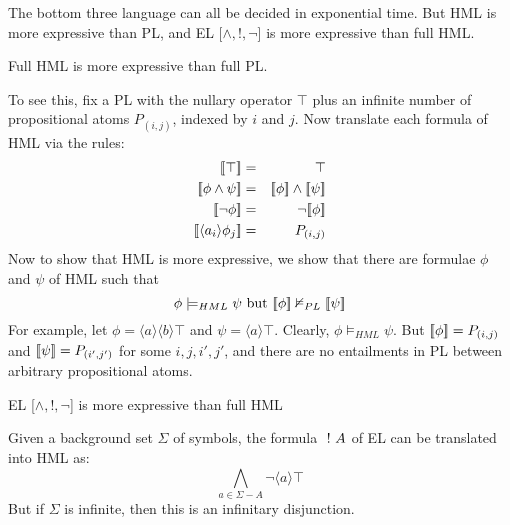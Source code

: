 The bottom three language can all be decided in exponential time.
But HML is more expressive than PL, and EL [$\land, !, \neg$]  is more expressive than full HML. 
\begin{proposition}
Full HML  is more expressive than full PL.
\end{proposition}
To see this, fix a PL with the nullary operator $\top$ plus an infinite number of propositional atoms $P_{(i,j)}$, indexed by $i$ and $j$.
Now translate each formula of HML via the rules:
\begin{eqnarray*}
\SEMB{\top}  & = & \top  \\
\SEMB{\phi \land \psi} & = & \SEMB{\phi} \land \SEMB{\psi}  \\
\SEMB{\neg \phi} & = & \neg \SEMB{\phi}   \\
\SEMB{\langle a_i \rangle \phi_j} & = & P_{(i,j)} 
\end{eqnarray*}
Now to show that HML is more expressive, we show that there are formulae $\phi$ and $\psi$ of HML such that
\[
\phi \models_{HML} \psi \mbox{ but } \lbrack\!\lbrack \phi \rbrack\!\rbrack \nvDash_{PL} \lbrack\!\lbrack \psi \rbrack\!\rbrack
\]
For example, let $\phi = \langle a \rangle \langle b \rangle \top$ and $\psi = \langle a \rangle \top$.
Clearly, $\phi \models_{HML} \psi$. But $\lbrack\!\lbrack \phi \rbrack\!\rbrack = P_{(i,j)}$ and $\lbrack\!\lbrack \psi \rbrack\!\rbrack = P_{(i',j')}$ for some $i,j,i',j'$, and there are no entailments in PL between arbitrary propositional atoms.

\begin{proposition}
EL [$\land, !, \neg$]  is more expressive than full HML
\end{proposition}
Given a background set $\Sigma$ of symbols, the formula $\ ! \  A$ of EL can be translated into HML as:
\[
\bigwedge_{a \in \Sigma - A} \neg \langle a \rangle \top
\]
But if $\Sigma$ is infinite, then this is an infinitary disjunction.
